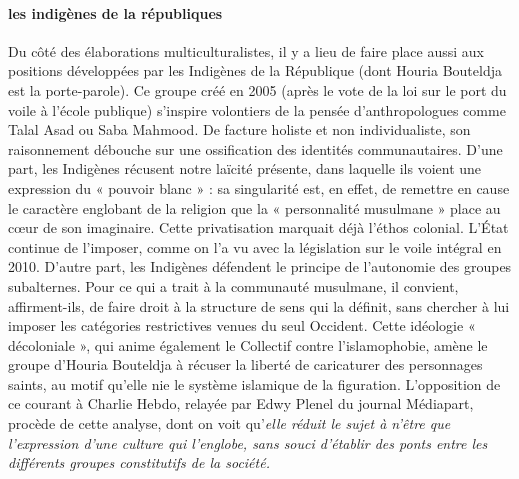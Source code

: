 \paragraph{les indigènes de la républiques} Du côté des élaborations multiculturalistes, il y a lieu de faire place aussi aux positions développées par les Indigènes de la République (dont Houria Bouteldja est la porte-parole). Ce groupe créé en 2005 (après le vote de la loi sur le port du voile à l’école publique) s’inspire volontiers de la pensée d’anthropologues comme Talal Asad ou Saba Mahmood. De facture holiste et non individualiste, son raisonnement débouche sur une ossification des identités communautaires. D’une part, les Indigènes récusent notre laïcité présente, dans laquelle ils voient une expression du « pouvoir blanc » : sa singularité est, en effet, de remettre en cause le caractère englobant de la religion que la « personnalité musulmane » place au cœur de son imaginaire. Cette privatisation marquait déjà l’éthos colonial. L’État continue de l’imposer, comme on l’a vu avec la législation sur le voile intégral en 2010. D’autre part, les Indigènes défendent le principe de l’autonomie des groupes subalternes. Pour ce qui a trait à la communauté musulmane, il convient, affirment-ils, de faire droit à la structure de sens qui la définit, sans chercher à lui imposer les catégories restrictives venues du seul Occident. Cette idéologie « décoloniale », qui anime également le Collectif contre l’islamophobie, amène le groupe d’Houria Bouteldja à récuser la liberté de caricaturer des personnages saints, au motif qu’elle nie le système islamique de la figuration. L’opposition de ce courant à Charlie Hebdo, relayée par Edwy Plenel du journal Médiapart, procède de cette analyse, dont on voit qu’\textit{elle réduit le sujet à n’être que l’expression d’une culture qui l’englobe, sans souci d’établir des ponts entre les différents groupes constitutifs de la société.}

